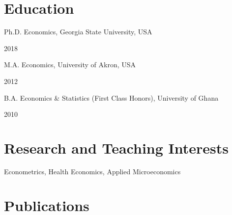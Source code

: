 \documentclass[12pt,letterpaper]{article}
\renewenvironment{itemize}{
	\begin{list}{}{
			\setlength{\leftmargin}{1em}
			\setlength{\itemsep}{0.15em}
			\setlength{\parskip}{0pt}
			\setlength{\parsep}{0.2em}
		}
	}{
	\end{list}
}
\newcommand{\resitemwithdate}[2]{%
	\item 
	\begin{minipage}[t]{.75\linewidth}
		\raggedright #1%
	\end{minipage}
	\hfill
	\begin{minipage}[t]{.25\linewidth}
		\raggedright #2%
	\end{minipage}
	\vspace{-4ex}
}
\begin{document}
\section*{Education}

\begin{itemize}
	\resitemwithdate{ Ph.D. Economics, Georgia State University, USA}{\hspace{0.5cm} 2018 }
	\resitemwithdate{M.A. Economics, University of Akron, USA}{\hspace{0.5cm} 2012}
	\resitemwithdate{ B.A. Economics \& Statistics (First Class Honors), University of Ghana}{\hspace{0.5cm} 2010}
\end{itemize}


\section*{Research and Teaching Interests}
\begin{itemize}
	\item Econometrics, Health Economics, Applied Microeconomics
\end{itemize}

\section*{Publications}
\end{document}
